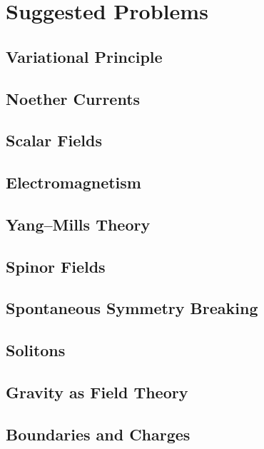 \chapter{Suggested Problems}

\section{Variational Principle}
\section{Noether Currents}
\section{Scalar Fields}
\section{Electromagnetism}
\section{Yang--Mills Theory}
\section{Spinor Fields}
\section{Spontaneous Symmetry Breaking}
\section{Solitons}
\section{Gravity as Field Theory}
\section{Boundaries and Charges}
